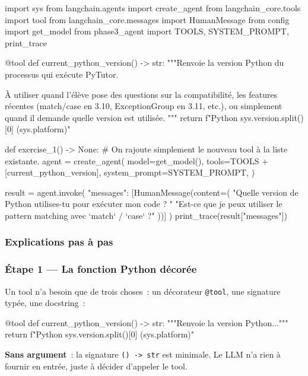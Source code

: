 \documentclass[11pt,a4paper]{article}
\begin{document}
\begin{pythoncode}
import sys
from langchain.agents import create_agent
from langchain_core.tools import tool
from langchain_core.messages import HumanMessage
from config import get_model
from phase3_agent import TOOLS, SYSTEM_PROMPT, print_trace


@tool
def current_python_version() -> str:
    """Renvoie la version Python du processus qui exécute PyTutor.

    À utiliser quand l'élève pose des questions sur la compatibilité, les
    features récentes (match/case en 3.10, ExceptionGroup en 3.11, etc.),
    ou simplement quand il demande quelle version est utilisée.
    """
    return f"Python {sys.version.split()[0]} ({sys.platform})"


def exercise_1() -> None:
    # On rajoute simplement le nouveau tool à la liste existante.
    agent = create_agent(
        model=get_model(),
        tools=TOOLS + [current_python_version],
        system_prompt=SYSTEM_PROMPT,
    )

    result = agent.invoke({
        "messages": [HumanMessage(content=(
            "Quelle version de Python utilises-tu pour exécuter mon code ? "
            "Est-ce que je peux utiliser le pattern matching avec `match` / `case` ?"
        ))]
    })
    print_trace(result["messages"])
\end{pythoncode}

\subsubsection{Explications pas à pas}

\subsubsection*{Étape 1 — La fonction Python décorée}

Un tool n'a besoin que de trois choses~: un décorateur \texttt{@tool},
une signature typée, une docstring~:

\begin{pythoncode}
@tool
def current_python_version() -> str:
    """Renvoie la version Python..."""
    return f"Python {sys.version.split()[0]} ({sys.platform})"
\end{pythoncode}

\textbf{Sans argument}~: la signature \texttt{() -> str} est minimale.
Le LLM n'a rien à fournir en entrée, juste à décider d'appeler le tool.
\end{document}
